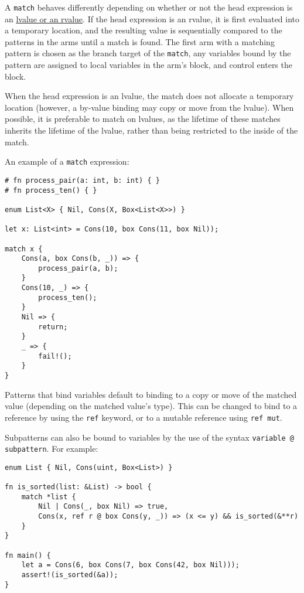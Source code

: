 \documentclass[]{article}
\begin{document}
A \texttt{match} behaves differently depending on whether or not the
head expression is an
\hyperref[lvaluesux2c-rvalues-and-temporaries]{lvalue or an rvalue}. If
the head expression is an rvalue, it is first evaluated into a temporary
location, and the resulting value is sequentially compared to the
patterns in the arms until a match is found. The first arm with a
matching pattern is chosen as the branch target of the \texttt{match},
any variables bound by the pattern are assigned to local variables in
the arm's block, and control enters the block.

When the head expression is an lvalue, the match does not allocate a
temporary location (however, a by-value binding may copy or move from
the lvalue). When possible, it is preferable to match on lvalues, as the
lifetime of these matches inherits the lifetime of the lvalue, rather
than being restricted to the inside of the match.

An example of a \texttt{match} expression:

\begin{verbatim}
# fn process_pair(a: int, b: int) { }
# fn process_ten() { }

enum List<X> { Nil, Cons(X, Box<List<X>>) }

let x: List<int> = Cons(10, box Cons(11, box Nil));

match x {
    Cons(a, box Cons(b, _)) => {
        process_pair(a, b);
    }
    Cons(10, _) => {
        process_ten();
    }
    Nil => {
        return;
    }
    _ => {
        fail!();
    }
}
\end{verbatim}

Patterns that bind variables default to binding to a copy or move of the
matched value (depending on the matched value's type). This can be
changed to bind to a reference by using the \texttt{ref} keyword, or to
a mutable reference using \texttt{ref mut}.

Subpatterns can also be bound to variables by the use of the syntax
\texttt{variable @ subpattern}. For example:

\begin{verbatim}
enum List { Nil, Cons(uint, Box<List>) }

fn is_sorted(list: &List) -> bool {
    match *list {
        Nil | Cons(_, box Nil) => true,
        Cons(x, ref r @ box Cons(y, _)) => (x <= y) && is_sorted(&**r)
    }
}

fn main() {
    let a = Cons(6, box Cons(7, box Cons(42, box Nil)));
    assert!(is_sorted(&a));
}
\end{verbatim}
\end{document}
